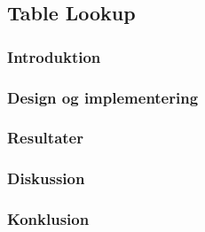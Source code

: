 \subsection{Table Lookup}

\subsubsection{Introduktion}

\subsubsection{Design og implementering}

\subsubsection{Resultater}

\subsubsection{Diskussion}

\subsubsection{Konklusion}
